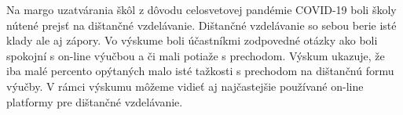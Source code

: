 \documentclass[10pt,oneside,slovak,a4paper]{article}
\begin{document}
Na margo uzatvárania škôl z dôvodu celosvetovej pandémie COVID-19 boli školy nútené prejsť na dištančné vzdelávanie. Dištančné vzdelávanie so sebou berie isté klady ale aj zápory. Vo výskume boli účastníkmi zodpovedné otázky ako boli spokojní s on-line výučbou a či mali potiaže s prechodom.
Výskum ukazuje, že iba malé percento opýtaných malo isté tažkosti s prechodom na dištančnú formu výučby. V rámci výskumu môžeme vidieť aj najčastejšie používané on-line platformy pre dištančné vzdelávanie.









\end{document}
